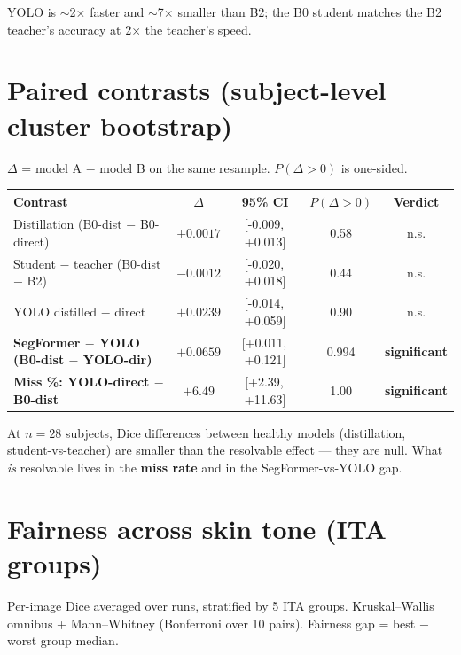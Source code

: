 \documentclass[11pt]{article}
\newcommand{\best}[1]{\textbf{#1}}
\newcommand{\sig}{\textcolor{red!70!black}{\textbf{significant}}}
\newcommand{\ns}{n.s.}
\newcommand{\ci}[2]{[#1,\,#2]}
\begin{document}
YOLO is $\sim$2$\times$ faster and $\sim$7$\times$ smaller than B2; the B0
student matches the B2 teacher's accuracy at 2$\times$ the teacher's speed.

\section{Paired contrasts (subject-level cluster bootstrap)}

$\Delta$ = model A $-$ model B on the same resample. $P(\Delta{>}0)$ is
one-sided.

\begin{center}
\small
\setlength{\tabcolsep}{4pt}
\begin{tabular}{lcccc}
\toprule
Contrast & $\Delta$ & 95\% CI & $P(\Delta{>}0)$ & Verdict \\
\midrule
Distillation (B0-dist $-$ B0-direct)   & $+0.0017$ & \ci{-0.009}{+0.013} & 0.58 & \ns \\
Student $-$ teacher (B0-dist $-$ B2)   & $-0.0012$ & \ci{-0.020}{+0.018} & 0.44 & \ns \\
YOLO distilled $-$ direct              & $+0.0239$ & \ci{-0.014}{+0.059} & 0.90 & \ns \\
\best{SegFormer $-$ YOLO (B0-dist $-$ YOLO-dir)} & \best{$+0.0659$} & \ci{+0.011}{+0.121} & 0.994 & \sig \\
\best{Miss \%: YOLO-direct $-$ B0-dist}         & \best{$+6.49$}   & \ci{+2.39}{+11.63}  & 1.00  & \sig \\
\bottomrule
\end{tabular}
\end{center}

At $n{=}28$ subjects, Dice differences between healthy models (distillation,
student-vs-teacher) are smaller than the resolvable effect --- they are null.
What \emph{is} resolvable lives in the \textbf{miss rate} and in the
SegFormer-vs-YOLO gap.

\section{Fairness across skin tone (ITA groups)}

Per-image Dice averaged over runs, stratified by 5 ITA groups.
Kruskal--Wallis omnibus + Mann--Whitney (Bonferroni over 10 pairs).
Fairness gap = best $-$ worst group median.
\end{document}
